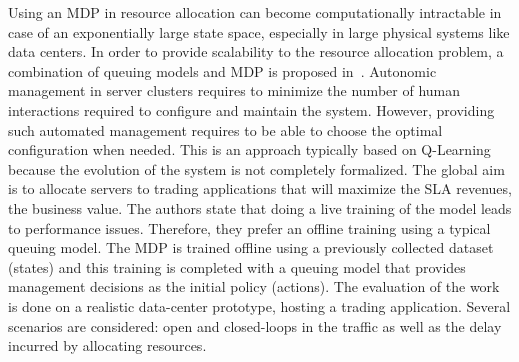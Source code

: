 Using an MDP in resource allocation can become computationally intractable in case of an exponentially large state space, especially in large physical systems like data centers. In order to provide scalability to the resource allocation problem, a combination of queuing models and MDP is proposed in~\cite{Tesauro2006}.
Autonomic management in server clusters requires to minimize the number of human interactions required to configure and maintain the system.
However, providing such automated management requires to be able to choose the optimal configuration when needed.
This is an approach typically based on Q-Learning because the evolution of the system is not completely formalized.
The global aim is to allocate servers to trading applications that will maximize the SLA revenues, \ie the business value.
The authors state that doing a live training of the model leads to performance issues. Therefore, they prefer an offline training using a typical queuing model. The MDP is trained offline using a previously collected dataset (states) and this training is completed with a queuing model that provides management decisions as the initial policy (actions).
The evaluation of the work is done on a realistic data-center prototype, hosting a trading application. 
Several scenarios are considered: open and closed-loops in the traffic as well as the delay incurred by allocating resources.



